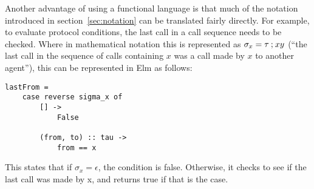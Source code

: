 Another advantage of using a functional language is that much of the notation introduced in section~\ref{sec:notation} can be translated fairly directly.
For example, to evaluate protocol conditions, the last call in a call sequence needs to be checked.
Where in mathematical notation this is represented as \(\sigma_x = \tau \mathbin{;} xy\) (``the last call in the sequence of calls containing \(x\) was a call made by \(x\) to another agent''), this can be represented in Elm as follows:

\begin{verbatim}
lastFrom = 
    case reverse sigma_x of
        [] ->
            False
        
        (from, to) :: tau ->
            from == x
\end{verbatim}

This states that if \(\sigma_x = \epsilon\), the condition is false. 
Otherwise, it checks to see if the last call was made by x, and returns true if that is the case.


